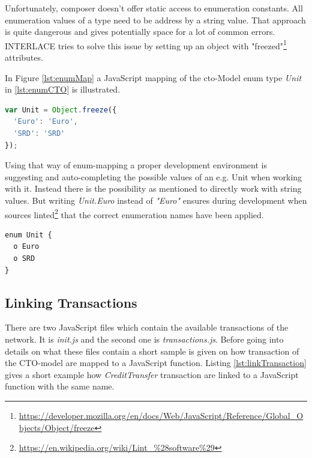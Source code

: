 Unfortunately, composer doesn't offer static access to enumeration constants. All enumeration values of a type need to be address by a string value. That approach is quite dangerous and gives potentially space for a lot of common errors. INTERLACE tries to solve this issue by setting up an object with "freezed"\footnote{\url{https://developer.mozilla.org/en/docs/Web/JavaScript/Reference/Global_Objects/Object/freeze}} attributes.

In Figure \ref{lst:enumMap} a JavaScript mapping of the cto-Model enum type \textit{Unit} in \ref{lst:enumCTO} is illustrated.

\begin{center}
\begin{minipage}{0.8\textwidth}
\small
\begin{lstlisting}[language=javascript,firstnumber=1,caption={\bf\small JavaScript enumeration mapping}, captionpos=b,label=lst:enumMap]
var Unit = Object.freeze({
  'Euro': 'Euro',
  'SRD': 'SRD'
});
\end{lstlisting}
\end{minipage}
\end{center}

Using that way of enum-mapping a proper development environment is suggesting and auto-completing the possible values of an e.g. Unit when working with it. Instead there is the possibility as mentioned to directly work with string values. But writing \textit{Unit.Euro} instead of \textit{"Euro"} ensures during development when sources linted\footnote{\url{https://en.wikipedia.org/wiki/Lint_\%28software\%29}} that the correct enumeration names have been applied.

\begin{center}
\begin{minipage}{0.8\textwidth}
\small
\begin{lstlisting}[language=cto,firstnumber=1,caption={\bf\small enum in CTO-model}, captionpos=b,label=lst:enumCTO]
enum Unit {
  o Euro
  o SRD
}
\end{lstlisting}
\end{minipage}
\end{center}

\subsection{Linking Transactions}
\label{sec:link transactions}

There are two JavaScript files which contain the available transactions of the network. It is \textit{init.js} and the second one is \textit{transactions.js}. Before going into details on what these files contain a short sample is given on how transaction of the CTO-model are mapped to a JavaScript function. Listing \ref{lst:linkTransaction} gives a short example how \textit{CreditTransfer} transaction are linked to a JavaScript function with the same name.

